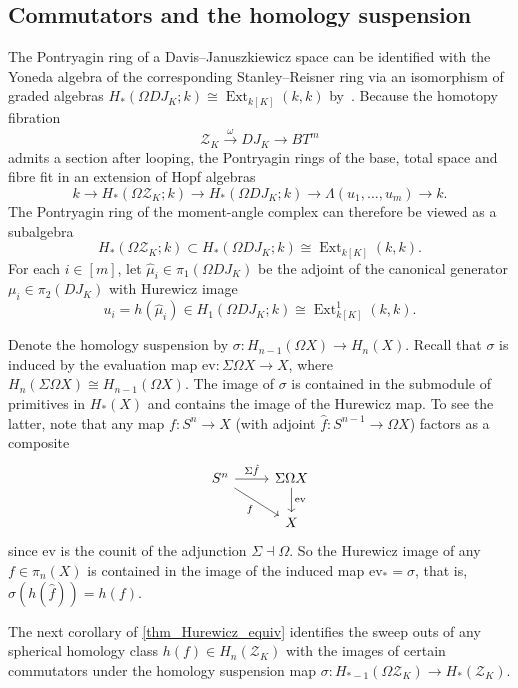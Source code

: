 \documentclass[a4paper,10pt]{amsart}
\theoremstyle{definition}
\theoremstyle{remark}
\DeclareMathOperator{\Ext}{Ext}
\begin{document}
\subsection*{Commutators and the homology suspension}
 
The Pontryagin ring of a Davis--Januszkiewicz space can be identified with the Yoneda algebra of the corresponding Stanley--Reisner ring via an isomorphism of graded algebras $H_*(\Omega DJ_K;k)\cong \Ext_{k[K]}(k,k)$ by~\cite[Proposition~8.4.10]{BP}.
Because the homotopy fibration
\[ \mathcal{Z}_K \stackrel{\omega}{\longrightarrow} DJ_K \longrightarrow BT^m \]
admits a section after looping, the Pontryagin rings of the base, total space and fibre fit in an extension of Hopf algebras
\begin{equation} \label{eq_Hopf}
k \longrightarrow H_*(\Omega\mathcal{Z}_K;k) \longrightarrow H_*(\Omega DJ_K;k) \longrightarrow \Lambda(u_1,\ldots,u_m) \longrightarrow k.
\end{equation}
The Pontryagin ring of the moment-angle complex can therefore be viewed as a subalgebra 
\[
H_*(\Omega\mathcal{Z}_K;k)\subset H_*(\Omega DJ_K;k)\cong\Ext_{k[K]}(k,k).
\]
For each $i\in[m]$, let $\hat{\mu}_i \in \pi_1(\Omega DJ_K)$ be the adjoint of the canonical generator $\mu_i\in\pi_2(DJ_K)$ with Hurewicz image \[ u_i=h(\hat{\mu}_i) \in H_1(\Omega DJ_K;k) \cong \Ext^1_{k[K]}(k,k).\] 

Denote the homology suspension by $\sigma\colon H_{n-1}(\Omega X) \to H_n(X)$. Recall that $\sigma$ is induced by the evaluation map $\mathrm{ev}\colon \Sigma\Omega X \to X$, where $H_n(\Sigma\Omega X)\cong H_{n-1}(\Omega X)$. The image of $\sigma$ is contained in the submodule of primitives in $H_*(X)$ and contains the image of the Hurewicz map. To see the latter, note that any map $f\colon S^n \to X$ (with adjoint $\hat{f}\colon S^{n-1}\to \Omega X$) factors as a composite
\begin{equation} \label{eq_susp_hom}
\begin{tikzcd}
S^n \ar[r, "\Sigma\hat{f}"] \ar[rd,"f"'] & \Sigma\Omega X \ar[d,"\mathrm{ev}"] \\
 & X
\end{tikzcd}
\end{equation}
since $\mathrm{ev}$ is the counit of the adjunction $\Sigma \dashv \Omega$. So the Hurewicz image of any $f\in\pi_n(X)$ is contained in the image of the induced map $\mathrm{ev}_*=\sigma$, that is, $\sigma(h(\hat{f}))=h(f)$. 

The next corollary of \cref{thm_Hurewicz_equiv} identifies the sweep outs of any spherical homology class $h(f)\in H_n(\mathcal{Z}_K)$ with the images of certain commutators under the homology suspension map $\sigma\colon H_{*-1}(\Omega\mathcal{Z}_K) \to H_*(\mathcal{Z}_K)$.
\end{document}
